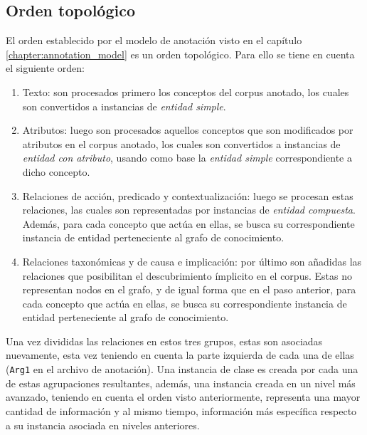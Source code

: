 \vspace{-0.1in}
\subsection{Orden topológico}
\vspace{-0.1in}
El orden establecido por el modelo de anotación visto en el capítulo \ref{chapter:annotation_model} es un orden topológico. Para ello se tiene en cuenta el siguiente orden:

\begin{enumerate}\label{enum:knowledge_graph_build_order}
	\vspace{-0.1in}
	\item Texto: son procesados primero los conceptos del corpus anotado, los cuales son convertidos a instancias de \textit{entidad simple}.
	\vspace{-0.1in}
	\item Atributos: luego son procesados aquellos conceptos que son modificados por atributos en el corpus anotado, los cuales son convertidos a instancias de \textit{entidad con atributo}, usando como base la \textit{entidad simple} correspondiente a dicho concepto.
	\vspace{-0.1in}
	\item Relaciones de acción, predicado y contextualización: luego se procesan estas relaciones, las cuales son representadas por instancias de \textit{entidad compuesta}. Además, para cada concepto que actúa en ellas, se busca su correspondiente instancia de entidad perteneciente al grafo de conocimiento.
	\vspace{-0.1in}
	\item Relaciones taxonómicas y de causa e implicación: por último son añadidas las relaciones que posibilitan el descubrimiento ímplicito en el corpus. Estas no representan nodos en el grafo, y de igual forma que en el paso anterior, para cada concepto que actúa en ellas, se busca su correspondiente instancia de entidad perteneciente al grafo de conocimiento.
\end{enumerate}

Una vez divididas las relaciones en estos tres grupos, estas son asociadas nuevamente, esta vez teniendo en cuenta la parte izquierda de cada una de ellas (\texttt{Arg1} en el archivo de anotación). Una instancia de clase es creada por cada una de estas agrupaciones resultantes, además, una instancia creada en un nivel más avanzado, teniendo en cuenta el orden visto anteriormente, representa una mayor cantidad de información y al mismo tiempo, información más específica respecto a su instancia asociada en niveles anteriores.

